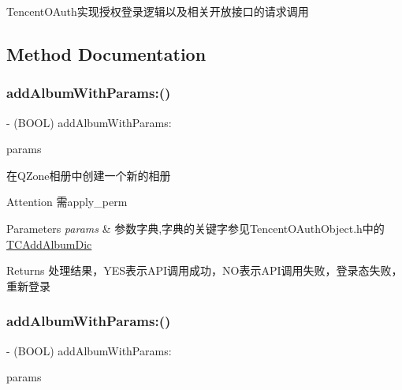 Tencent\+O\+Auth实现授权登录逻辑以及相关开放接口的请求调用 

\subsection{Method Documentation}
\mbox{\label{interface_tencent_o_auth_ade1376b852ac4968ad344b251edd129d}} 
\subsubsection{\texorpdfstring{add\+Album\+With\+Params\+:()}{addAlbumWithParams:()}\hspace{0.1cm}{\footnotesize\ttfamily [1/2]}}
{\footnotesize\ttfamily -\/ (B\+O\+OL) add\+Album\+With\+Params\+: \begin{DoxyParamCaption}\item[{(N\+S\+Mutable\+Dictionary $\ast$)}]{params }\end{DoxyParamCaption}}

在\+Q\+Zone相册中创建一个新的相册 \begin{DoxyAttention}{Attention}
需apply\+\_\+perm 
\end{DoxyAttention}

\begin{DoxyParams}{Parameters}
{\em params} & 参数字典,字典的关键字参见\+Tencent\+O\+Auth\+Object.\+h中的\mbox{\hyperlink{interface_t_c_add_album_dic}{T\+C\+Add\+Album\+Dic}} \\
\hline
\end{DoxyParams}
\begin{DoxyReturn}{Returns}
处理结果，\+Y\+E\+S表示\+A\+P\+I调用成功，\+N\+O表示\+A\+P\+I调用失败，登录态失败，重新登录 
\end{DoxyReturn}
\mbox{\label{interface_tencent_o_auth_ade1376b852ac4968ad344b251edd129d}} 
\subsubsection{\texorpdfstring{add\+Album\+With\+Params\+:()}{addAlbumWithParams:()}\hspace{0.1cm}{\footnotesize\ttfamily [2/2]}}
{\footnotesize\ttfamily -\/ (B\+O\+OL) add\+Album\+With\+Params\+: \begin{DoxyParamCaption}\item[{(N\+S\+Mutable\+Dictionary $\ast$)}]{params }\end{DoxyParamCaption}}

